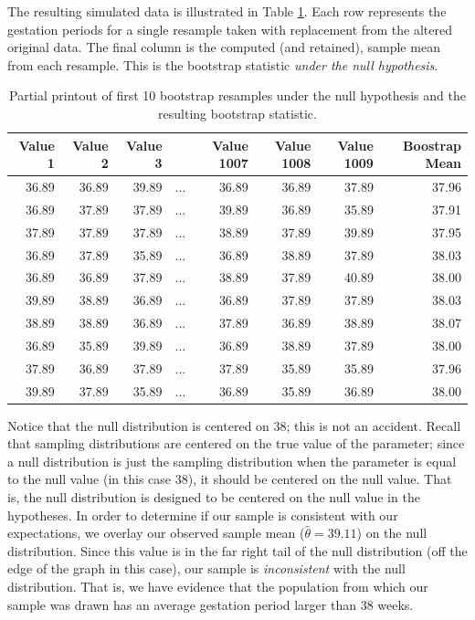\documentclass[
]{book}
\theoremstyle{plain}
\theoremstyle{mydefn}
\theoremstyle{myexmpl}
\theoremstyle{remark}
\begin{document}
The resulting simulated data is illustrated in Table \ref{tab:singleteststat-bootstrap-mean}. Each row represents the gestation periods for a single resample taken with replacement from the altered original data. The final column is the computed (and retained), sample mean from each resample. This is the bootstrap statistic \emph{under the null hypothesis}.

\begin{table}

\caption{\label{tab:singleteststat-bootstrap-mean}Partial printout of first 10 bootstrap resamples under the null hypothesis and the resulting bootstrap statistic.}
\centering
\begin{tabular}[t]{r|r|r|l|r|r|r|r}
\hline
Value 1 & Value 2 & Value 3 &         & Value 1007 & Value 1008 & Value 1009 & Boostrap Mean\\
\hline
36.89 & 36.89 & 39.89 & ... & 36.89 & 36.89 & 37.89 & 37.96\\
\hline
36.89 & 37.89 & 37.89 & ... & 39.89 & 36.89 & 35.89 & 37.91\\
\hline
37.89 & 37.89 & 37.89 & ... & 38.89 & 37.89 & 39.89 & 37.95\\
\hline
36.89 & 37.89 & 35.89 & ... & 36.89 & 38.89 & 37.89 & 38.03\\
\hline
36.89 & 36.89 & 37.89 & ... & 38.89 & 37.89 & 40.89 & 38.00\\
\hline
39.89 & 38.89 & 36.89 & ... & 36.89 & 37.89 & 37.89 & 38.03\\
\hline
38.89 & 38.89 & 36.89 & ... & 37.89 & 36.89 & 38.89 & 38.07\\
\hline
36.89 & 35.89 & 39.89 & ... & 36.89 & 38.89 & 37.89 & 38.00\\
\hline
37.89 & 36.89 & 37.89 & ... & 37.89 & 35.89 & 35.89 & 37.96\\
\hline
39.89 & 37.89 & 35.89 & ... & 36.89 & 35.89 & 36.89 & 38.00\\
\hline
\end{tabular}
\end{table}

Notice that the null distribution is centered on 38; this is not an accident. Recall that sampling distributions are centered on the true value of the parameter; since a null distribution is just the sampling distribution when the parameter is equal to the null value (in this case 38), it should be centered on the null value. That is, the null distribution is designed to be centered on the null value in the hypotheses. In order to determine if our sample is consistent with our expectations, we overlay our observed sample mean (\(\widehat{\theta} = 39.11\)) on the null distribution. Since this value is in the far right tail of the null distribution (off the edge of the graph in this case), our sample is \emph{inconsistent} with the null distribution. That is, we have evidence that the population from which our sample was drawn has an average gestation period larger than 38 weeks.
\end{document}

